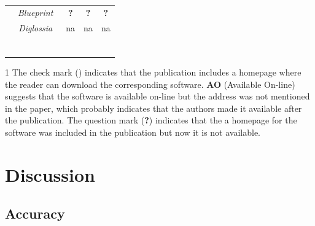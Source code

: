 \documentclass[conference]{IEEEtran}
\makeatletter
\newcommand{\tick}{\ding{52}}
\newcommand{\thickhline}{%
    \noalign {\ifnum 0=`}\fi \hrule height 1pt
    \futurelet \reserved@a \@xhline
}
\makeatother
\begin{document}
\begin{table}
\begin{threeparttable}
\begin{small}
{\begin{tabular}{l|c|ccc}
  &   {\it Blueprint}~\cite{LV09} & {\bf ?} & {\bf ?} & {\bf ?} \\
  &   {\it Diglossia}~\cite{SMS13} & {\sc na} & {\sc na} & {\sc na} \\
  \thickhline
    \end{tabular}}
    \begin{tablenotes}
  \begin{footnotesize}
       \item[1] The check mark (\tick) indicates that the publication
       includes a homepage where the reader can 
       download the corresponding software. {\bf AO} (Available On-line) suggests
       that the software is available on-line but the
       address was not mentioned in the paper, which probably indicates that
       the authors made it available after the publication. The question 
       mark ({\bf ?}) indicates that the a homepage for the software
       was included
       in the publication but now it is not available.
  \end{footnotesize}
    \end{tablenotes}
    \end{small}
    \end{threeparttable}
\end{table}

\section{Discussion}
\label{sec:discussion}

\subsection{Accuracy}
\end{document}
